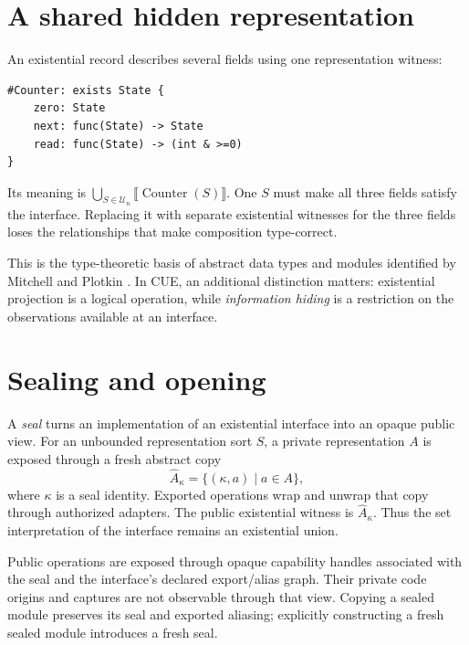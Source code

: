 \documentclass[11pt,a4paper,oneside]{report}
\newcommand{\sem}[1]{\llbracket #1\rrbracket}
\newcommand{\U}{\mathcal U}
\theoremstyle{remark}
\begin{document}
\section{A shared hidden representation}
An existential record describes several fields using one representation witness:
\par\noindent\begin{minipage}{\linewidth}
\begin{lstlisting}
#Counter: exists State {
    zero: State
    next: func(State) -> State
    read: func(State) -> (int & >=0)
}
\end{lstlisting}
\end{minipage}\par
Its meaning is $\bigcup_{S\in\U_n}\sem{\operatorname{Counter}(S)}$.
One $S$ must make all three fields satisfy the interface. Replacing it with
separate existential witnesses for the three fields loses the relationships
that make composition type-correct.

This is the type-theoretic basis of abstract data types and modules identified
by Mitchell and Plotkin \cite{mitchellplotkin}. In CUE, an additional distinction
matters: existential projection is a logical operation, while \emph{information
hiding} is a restriction on the observations available at an interface.

\section{Sealing and opening}
A \emph{seal} turns an implementation of an existential interface into an opaque
public view. For an unbounded representation sort $S$, a private representation
$A$ is exposed through a fresh abstract copy
\[
 \widehat A_\kappa=\{(\kappa,a)\mid a\in A\},
\]
where $\kappa$ is a seal identity. Exported operations wrap and unwrap that copy
through authorized adapters. The public existential witness is $\widehat A_\kappa$.
Thus the set interpretation of the interface remains an existential union.

Public operations are exposed through opaque capability handles associated
with the seal and the interface's declared export/alias graph. Their private
code origins and captures are not observable through that view. Copying a sealed
module preserves its seal and exported aliasing; explicitly constructing a fresh
sealed module introduces a fresh seal.
\end{document}
